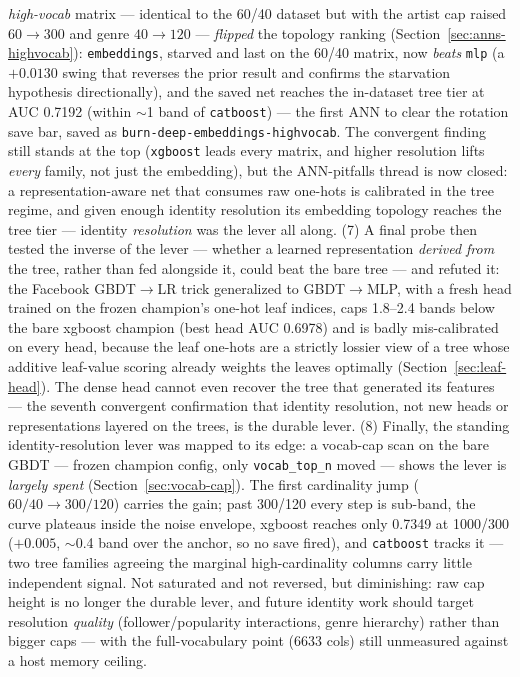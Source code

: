 \documentclass[11pt]{article}
\begin{document}
\emph{high-vocab} matrix --- identical to the 60/40 dataset but with the artist
cap raised $60\to300$ and genre $40\to120$ --- \emph{flipped} the topology
ranking (Section~\ref{sec:anns-highvocab}): \texttt{embeddings}, starved and
last on the 60/40 matrix, now \emph{beats} \texttt{mlp} (a $+0.0130$ swing that
reverses the prior result and confirms the starvation hypothesis directionally),
and the saved net reaches the in-dataset tree tier at AUC \num{0.7192} (within
$\sim$1 band of \texttt{catboost}) --- the first ANN to clear the rotation save
bar, saved as \texttt{burn-deep-embeddings-highvocab}. The convergent finding
still stands at the top (\texttt{xgboost} leads every matrix, and higher
resolution lifts \emph{every} family, not just the embedding), but the
ANN-pitfalls thread is now closed: a representation-aware net that consumes raw
one-hots is calibrated in the tree regime, and given enough identity resolution
its embedding topology reaches the tree tier --- identity \emph{resolution} was
the lever all along.
(7) A final probe then tested the inverse of the lever --- whether a learned representation \emph{derived from} the tree, rather than fed alongside it, could beat the bare tree --- and refuted it: the Facebook GBDT$\to$LR trick generalized to GBDT$\to$MLP, with a fresh head trained on the frozen champion's one-hot leaf indices, caps \num{1.8}--\num{2.4} bands below the bare xgboost champion (best head AUC \num{0.6978}) and is badly mis-calibrated on every head, because the leaf one-hots are a strictly lossier view of a tree whose additive leaf-value scoring already weights the leaves optimally (Section~\ref{sec:leaf-head}). The dense head cannot even recover the tree that generated its features --- the seventh convergent confirmation that identity resolution, not new heads or representations layered on the trees, is the durable lever.
(8) Finally, the standing identity-resolution lever was mapped to its edge: a vocab-cap scan on the bare GBDT --- frozen champion config, only \texttt{vocab\_top\_n} moved --- shows the lever is \emph{largely spent} (Section~\ref{sec:vocab-cap}). The first cardinality jump ($60/40\to300/120$) carries the gain; past 300/120 every step is sub-band, the curve plateaus inside the noise envelope, xgboost reaches only \num{0.7349} at 1000/300 ($+0.005$, $\sim$0.4 band over the anchor, so no save fired), and \texttt{catboost} tracks it --- two tree families agreeing the marginal high-cardinality columns carry little independent signal. Not saturated and not reversed, but diminishing: raw cap height is no longer the durable lever, and future identity work should target resolution \emph{quality} (follower/popularity interactions, genre hierarchy) rather than bigger caps --- with the full-vocabulary point (6633 cols) still unmeasured against a host memory ceiling.
\end{document}

